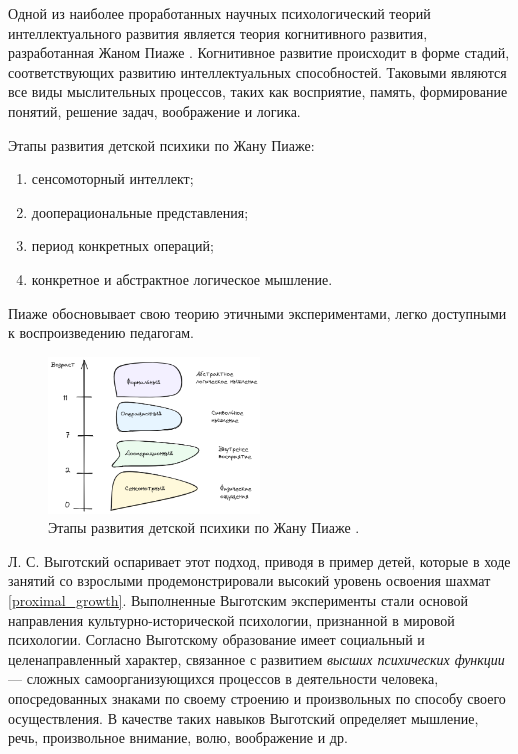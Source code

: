 Одной из наиболее проработанных научных психологический теорий интеллектуального развития 
является теория когнитивного развития, разработанная Жаном Пиаже \cite{piaget1952origins}.
Когнитивное развитие происходит в форме стадий, соответствующих развитию интеллектуальных
способностей. Таковыми являются все виды мыслительных процессов, таких как восприятие,
память, формирование понятий, решение задач, воображение и логика.

Этапы развития детской психики по Жану Пиаже:

\begin{enumerate}
    \item сенсомоторный интеллект;
    \item дооперациональные представления;
    \item период конкретных операций;
    \item конкретное и абстрактное логическое мышление. 
\end{enumerate}

Пиаже обосновывает свою теорию этичными экспериментами, легко доступными к воспроизведению педагогам.

\begin{figure}[h]
    \centering
    \includegraphics[width=0.5\textwidth]{assets/pedagogic/psy/piage.excalidraw.png}
    \caption{Этапы развития детской психики по Жану Пиаже \cite{piaget1952origins}.}
    \label{piage}
\end{figure}



Л. С. Выготский оспаривает этот подход, приводя в пример детей, которые в ходе занятий со взрослыми продемонстрировали
высокий уровень освоения шахмат \ref{proximal_growth}. Выполненные Выготским
эксперименты стали основой направления культурно-исторической психологии, признанной в мировой психологии.
Согласно Выготскому образование имеет социальный и целенаправленный характер, связанное с развитием
\textit{высших психических функции} --- сложных самоорганизующихся процессов в деятельности человека, 
опосредованных знаками по своему строению и произвольных по способу своего осуществления. В качестве таких навыков Выготский
определяет мышление, речь, произвольное внимание, волю, воображение и др.


